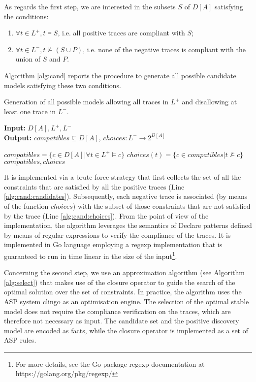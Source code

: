 As regards the first step, we are interested in the subsets $S$ of $D[A]$ satisfying the conditions:
\begin{enumerate}
\item $\forall t \in L^+, t \models S$, i.e. all positive traces are compliant with $S$;
\item $\forall t \in L^-, t \not\models (S \cup P)$, i.e. none of the negative traces is compliant with the union of $S$ and $P$.
\end{enumerate}
%
Algorithm \ref{alg:cand} reports the procedure to generate all possible candidate models satisfying these two conditions.
%
\begin{algorithm}
    \caption{Generation of all possible models allowing all traces in $L^+$ and disallowing at least one trace in $L^-$.}
    \label{alg:cand}
    \textbf{Input:}  $D[A], L^+, L^-$\\
    \textbf{Output:} ${compatibles} \subseteq D[A]$, ${choices} : L^- \rightarrow 2^{D[A]}$
	\begin{algorithmic}[1] 
   	\State ${compatibles}= \{c \in D[A] | \forall t \in L^+ \models c\}$ \label{alg:cand:candidates}
		\State ${choices}(t) = \{c \in {compatibles} | t \not\models c\}$\label{alg:cand:choices}
	\EndFor
	\State \Return ${compatibles}, {choices}$
    \EndProcedure
    \end{algorithmic}
\end{algorithm}
%
It is implemented via a brute force strategy that first collects the set of all the constraints that are satisfied by all the positive traces (Line \ref{alg:cand:candidates}). Subsequently, each negative trace is associated (by means of the function ${choices}$) with the subset of those constraints that are not satisfied by the trace  (Line \ref{alg:cand:choices}). 
From the point of view of the implementation, the algorithm leverages the semantics of Declare patterns defined by means of regular expressions \cite{2017-DiCiccio} to verify the compliance of the traces. It is implemented in Go language employing a regexp implementation that is guaranteed to run in time linear in the size of the input\footnote{For more details, see the Go package regexp documentation at https://golang.org/pkg/regexp/}. 



Concerning the second step, we use an approximation algorithm (see Algorithm \ref{alg:select}) that makes use of the closure operator to guide the search of the optimal solution over the set of constraints. 
%
In practice, the algorithm uses the \ac{ASP} \cite{2008-Lifschitz} system clingo as an optimisation engine. The selection of the optimal stable model does not require the compliance verification on the traces, which are therefore not necessary as input. The candidate set and the positive discovery model are encoded as facts, while the closure operator is implemented as a set of \ac{ASP} rules.

